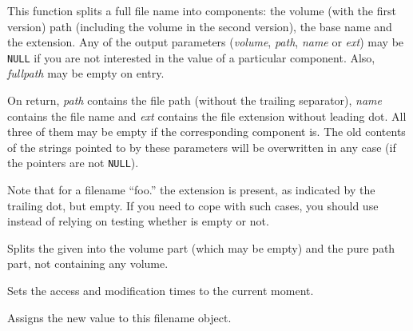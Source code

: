 This function splits a full file name into components: the volume (with the
first version) path (including the volume in the second version), the base name
and the extension. Any of the output parameters ({\it volume}, {\it path}, 
{\it name} or {\it ext}) may be {\tt NULL} if you are not interested in the
value of a particular component. Also, {\it fullpath} may be empty on entry.

On return, {\it path} contains the file path (without the trailing separator), 
{\it name} contains the file name and {\it ext} contains the file extension
without leading dot. All three of them may be empty if the corresponding
component is. The old contents of the strings pointed to by these parameters
will be overwritten in any case (if the pointers are not {\tt NULL}).

Note that for a filename ``foo.'' the extension is present, as indicated by the
trailing dot, but empty. If you need to cope with such cases, you should use 
 instead of relying on testing whether  is empty or not.


\label{wxfilenamesplitvolume}


Splits the given  into the volume part (which may be empty) and
the pure path part, not containing any volume.




\label{wxfilenametouch}


Sets the access and modification times to the current moment.


\label{wxfilenameoperatorassign}



Assigns the new value to this filename object.


\label{wxfilenameoperatorequal}


